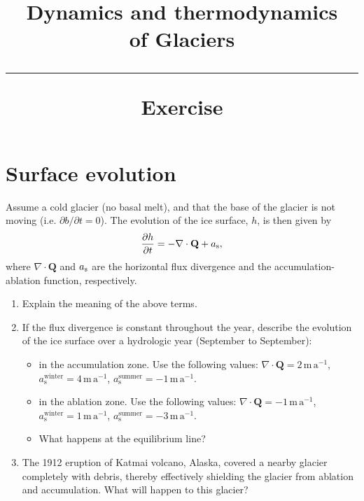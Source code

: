\documentclass[parskip=half]{scrartcl}
\begin{document}
\vspace{-5em}

\title{Dynamics and thermodynamics \\ of Glaciers \\[.2em]
\rule[1em]{\textwidth}{2pt}
\LARGE{\sf Exercise}
}
\date{}

\vspace{-5em}

\maketitle


\vspace{-5em}

\section{Surface evolution}

Assume a cold glacier (no basal melt), and that the base of the glacier is not moving (i.e. $\partial b / \partial t = 0$). The evolution of the ice surface, $h$, is then given by
\begin{equation} \label{eq:upper-surface-evolution}
\frac{\partial h}{\partial t} = - \nabla \cdot \mathbf{Q} + a_{\textrm s},
\end{equation}
where $\nabla \cdot \mathbf{Q}$ and $a_{\textrm s}$ are the horizontal flux divergence and the accumulation-ablation function, respectively.
\begin{enumerate}
\item Explain the meaning of the above terms.
\item If the flux divergence is constant throughout the year, describe the evolution of the ice surface over a hydrologic year (September to September):
  \begin{itemize}
    \item in the accumulation zone. Use the following values: $\nabla \cdot \mathbf{Q} = 2\,\text{m}\,\text{a}^{-1}$, $a_{\text{s}}^{\text{winter}}= 4\,\text{m}\,\text{a}^{-1}$, $a_{\text{s}}^{\text{summer}} = -1\,\text{m}\,\text{a}^{-1}$.
    \item in the ablation zone. Use the following values: $\nabla \cdot \mathbf{Q} = -1\,\text{m}\,\text{a}^{-1}$, $a_{\text{s}}^{\text{winter}}= 1\,\text{m}\,\text{a}^{-1}$, $a_{\text{s}}^{\text{summer}} = -3\,\text{m}\,\text{a}^{-1}$.
    \item What happens at the equilibrium line?
  \end{itemize}
\item The 1912 eruption of Katmai volcano, Alaska, covered a nearby glacier completely with debris, thereby effectively shielding the glacier from ablation and accumulation. What will happen to this glacier? 
\end{enumerate}
\end{document}
